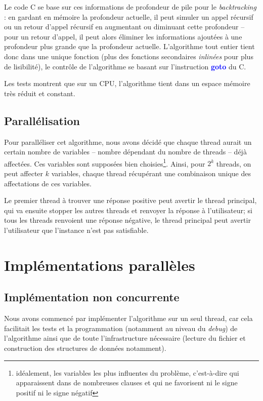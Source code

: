 \documentclass{article}
\newcommand{\keyword}[1]{\textbf{\textcolor{blue}{#1}}}
\begin{document}
Le code C se base sur ces informations de profondeur de pile pour le \emph{backtracking} : en gardant en mémoire la profondeur actuelle, il peut simuler un appel récursif ou un retour d'appel récursif en augmentant ou diminuant cette profondeur -- pour un retour d'appel, il peut alors éliminer les informations ajoutées à une profondeur plus grande que la profondeur actuelle. L'algorithme tout entier tient donc dans une unique fonction (plus des fonctions secondaires \emph{inlinées} pour plus de lisibilité), le contrôle de l'algorithme se basant sur l'instruction \keyword{goto} du C.

Les tests montrent que sur un \textsc{CPU}, l'algorithme tient dans un espace mémoire très réduit et constant.


\subsection{Parallélisation}
    Pour paralléliser cet algorithme, nous avons décidé que chaque thread aurait un certain nombre de variables -- nombre dépendant du nombre de threads -- déjà affectées. Ces variables sont supposées bien choisies\footnote{idéalement, les variables les plus \og influentes \fg du problème, c'est-à-dire qui apparaissent dans de nombreuses clauses et qui ne favorisent ni le signe positif ni le signe négatif}. Ainsi, pour $2^{k}$ threads, on peut affecter $k$ variables, chaque thread récupérant une combinaison unique des affectations de ces variables.

    Le premier thread à trouver une réponse positive peut avertir le thread principal, qui va ensuite stopper les autres threads et renvoyer la réponse à l'utilisateur; si tous les threads renvoient une réponse négative, le thread principal peut avertir l'utilisateur que l'instance n'est pas satisfiable.


\section{Implémentations parallèles}
\subsection{Implémentation non concurrente}
    Nous avons commencé par implémenter l'algorithme sur un seul thread, car cela facilitait les tests et la programmation (notamment au niveau du \emph{debug}) de l'algorithme ainsi que de toute l'infrastructure nécessaire (lecture du fichier et construction des structures de données notamment). 
\end{document}
